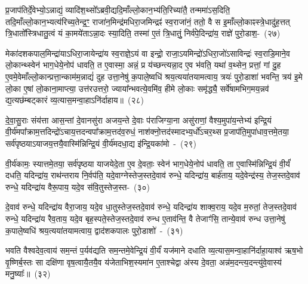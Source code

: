 {\anuvakamend[{ए॒वोपै॒तम॑स्मि॒न्त्रयो॑दश च}]}

प्र॒जा\-प॑तिर्दे॒वेभ्यो॒\-ऽन्नाद्यं॒ व्यादि॑श॒थ्सो᳚\-ऽब्रवी॒द्यदि॒माँल्लो॒का\-न॒भ्य॑ति॒\-रिच्या॑तै॒ तन्ममा॑\-ऽस॒दिति॒ तदि॒माँल्लो॒का\-न॒भ्यत्य॑रिच्य॒तेन्द्र॒ꣳ॒ राजा॑न॒\-मिन्द्र॑मधिरा॒जमिन्द्रꣴ॑ स्व॒राजा॑नं॒ ततो॒ वै स इ॒माँल्लो॒काꣴस्त्रे॒धा\-दु॑ह॒त्तत् त्रि॒धातो᳚स्त्रिधातु॒त्वं यं का॒मये॑ता\-ऽन्ना॒दः स्या॒दिति॒ तस्मा॑ ए॒तं त्रि॒धातुं॒ निर्व॑पे॒दिन्द्रा॑य॒ राज्ञे॑ पुरो॒डाश॒-~(२७)\ip

मेका॑\-दश\-कपाल॒मिन्द्रा॑या\-ऽधिरा॒जायेन्द्रा॑य स्व॒राज्ञे॒\-ऽयं वा इन्द्रो॒ राजा॒\-ऽयमिन्द्रो॑\-ऽधिरा॒जो॑\-ऽसाविन्द्रः॑ स्व॒राडि॒माने॒व लो॒कान्थ्स्वेन॑ भाग॒धेये॒नोप॑ धावति॒ त ए॒वास्मा॒ अन्नं॒ प्र य॑च्छन्त्यन्ना॒द ए॒व भ॑वति॒ यथा॑ व॒थ्सेन॒ प्रत्तां॒ गां दु॒ह ए॒वमे॒वेमाँल्लो॒कान्प्रत्ता॒न्काम॑म॒न्नाद्यं॑ दुह उत्ता॒नेषु॑ क॒पाले॒ष्वधि॑ श्रय॒त्यया॑तयामत्वाय॒ त्रयः॑ पुरो॒डाशा॑ भवन्ति॒ त्रय॑ इ॒मे लो॒का ए॒षां लो॒काना॒माप्त्या॒ उत्त॑रउत्तरो॒ ज्याया᳚न्भवत्ये॒वमि॑व॒ हीमे लो॒काः समृ॑द्ध्यै॒ सर्वे॑षामभिग॒मय॒न्नव॑ द्य॒त्यछ॑म्बट्कारं व्य॒त्यास॒मन्वा॒हा\-ऽनि॑र्दाहाय॥~(२८)\ip

{\anuvakamend[{पु॒रो॒डाश॒न्त्रयः॒ षड्विꣳ॑शतिश्च}]}

दे॒वा॒सु॒राः संय॑त्ता आस॒न्तां दे॒वानसु॑रा अजय॒न्ते दे॒वाः प॑राजिग्या॒ना असु॑राणां॒ वैश्य॒मुपा॑य॒न्तेभ्य॑ इन्द्रि॒यं वी॒र्य॑मपा᳚\-क्राम॒त्तदिन्द्रो॑\-ऽचाय॒त्तदन्वपा᳚\-क्राम॒त्तद॑व॒रुधं॒ नाश॑क्नो॒त्तद॑स्मा\-दभ्य॒र्धो॑\-ऽचर॒थ्स प्र॒जा\-प॑ति॒मुपा॑धाव॒त्तमे॒तया॒ सर्व॑पृष्ठया\-ऽयाजय॒त्त\-यै॒वास्मि॑न्निन्द्रि॒यं वी॒र्य॑मदधा॒द्य इ॑न्द्रि॒यका॑मो~-~(२९)\ip

वी॒र्य॑कामः॒ स्यात्तमे॒तया॒ सर्व॑पृष्ठया याजयेदे॒ता ए॒व दे॒वताः॒ स्वेन॑ भाग॒धेये॒नोप॑ धावति॒ ता ए॒वास्मि॑न्निन्द्रि॒यं वी॒र्यं॑ दधति॒ यदिन्द्रा॑य॒ राथ॑न्तराय नि॒र्वप॑ति॒ यदे॒वाग्नेस्तेज॒स्तदे॒वाव॑ रुन्धे॒ यदिन्द्रा॑य॒ बार्\mbox{}ह॑ताय॒ यदे॒वेन्द्र॑स्य॒ तेज॒स्तदे॒वाव॑ रुन्धे॒ यदिन्द्रा॑य वैरू॒पाय॒ यदे॒व स॑वि॒तुस्तेज॒स्त-~(३०)\ip

दे॒वाव॑ रुन्धे॒ यदिन्द्रा॑य वैरा॒जाय॒ यदे॒व धा॒तुस्तेज॒स्तदे॒वाव॑ रुन्धे॒ यदिन्द्रा॑य शाक्व॒राय॒ यदे॒व म॒रुतां॒ तेज॒स्तदे॒वाव॑ रुन्धे॒ यदिन्द्रा॑य रैव॒ताय॒ यदे॒व बृह॒स्पते॒स्तेज॒स्तदे॒वाव॑ रुन्ध ए॒ताव॑न्ति॒ वै तेजाꣳ॑सि॒ तान्ये॒वाव॑ रुन्ध उत्ता॒नेषु॑ क॒पाले॒ष्वधि॑ श्रय॒त्यया॑तयामत्वाय॒ द्वाद॑श\-कपालः पुरो॒डाशो॑~-~(३१)\ip

भवति वैश्वदेव॒त्वाय॑ सम॒न्तं प॒र्यव॑द्यति सम॒न्तमे॒वेन्द्रि॒यं वी॒र्यं॑ यज॑माने दधाति व्य॒त्यास॒मन्वा॒हानि॑र्दाहा॒याश्व॑ ऋष॒भो वृ॒ष्णिर्ब॒स्तः सा दक्षि॑णा वृष॒त्वायै॒तयै॒व य॑जेताभिश॒स्यमा॑न ए॒ताश्चेद्वा अ॑स्य दे॒वता॒ अन्न॑म॒दन्त्य॒दन्त्यु॑वे॒वास्य॑ मनु॒ष्याः᳚॥~(३२)\ip

